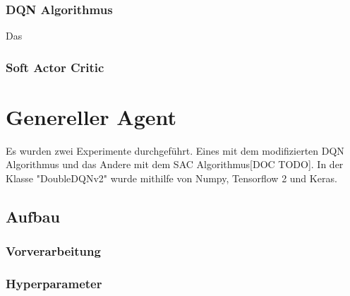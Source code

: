 \documentclass[a4paper,titlepage]{article}
\numberwithin{equation}{section} %
\begin{document}
{\subsubsection{DQN Algorithmus}
Das

\subsubsection{Soft Actor Critic}




\section{Genereller Agent}
Es wurden zwei Experimente durchgeführt. Eines mit dem modifizierten DQN Algorithmus und das Andere mit dem SAC Algorithmus[DOC TODO]. In der Klasse "DoubleDQNv2" wurde mithilfe von Numpy\cite{harris2020array}, Tensorflow 2\cite{tensorflow2015-whitepaper} und Keras\cite{}.

\subsection{Aufbau}

\subsubsection{Vorverarbeitung}

\subsubsection{Hyperparameter}


}
\end{document}
